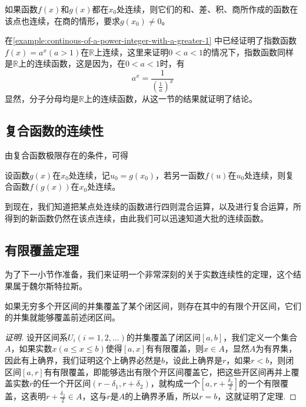 \begin{theorem}
  如果函数$f(x)$和$g(x)$都在$x_0$处连续，则它们的和、差、积、商所作成的函数在该点也连续，在商的情形，要求$g(x_0) \neq 0$。
\end{theorem}

\begin{example}
  \label{example:continous-of-power-function}
  在\autoref{example:continous-of-a-power-integer-with-a-greater-1} 中已经证明了指数函数$f(x)=a^x(a>1)$在$\mathbb{R}$上连续，这里来证明$0<a<1$的情况下，指数函数同样是$\mathbb{R}$上的连续函数，这是因为，在$0<a<1$时，有
  \[ a^x = \frac{1}{\left( \frac{1}{a} \right)^x} \]
  显然，分子分母均是$\mathbb{R}$上的连续函数，从这一节的结果就证明了结论。
\end{example}

\subsection{复合函数的连续性}
\label{sec:continuousness-of-composite-function}

由复合函数极限存在的条件，可得
\begin{theorem}[复合函数的连续性]
  \label{theorem:the-continuity-of-combine-function}
  设函数$g(x)$在$x_0$处连续，记$u_0=g(x_0)$，若另一函数$f(u)$在$u_0$处连续，则复合函数$f(g(x))$在$x_0$处连续。
\end{theorem}

到现在，我们知道把某点处连续的函数进行四则混合运算，以及进行复合运算，所得到的新函数仍然在该点连续，由此我们可以迅速知道大批的连续函数。

\subsection{有限覆盖定理}
\label{sec:finite-covering-theorem}

为了下一小节作准备，我们来证明一个非常深刻的关于实数连续性的定理，这个结果属于魏尔斯特拉斯。

\begin{theorem}[魏尔斯特拉斯有限覆盖定理]
  如果无穷多个开区间的并集覆盖了某个闭区间，则存在其中的有限个开区间，它们的并集就能够覆盖前述闭区间。
\end{theorem}

\begin{proof}[证明]
  设开区间系$U_i(i=1,2,\ldots)$的并集覆盖了闭区间$[a,b]$，我们定义一个集合$A$，如果实数$x(a \leqslant x \leqslant b)$使得$[a,x]$有有限覆盖，则$x \in A$，显然$A$为有界集，因此有上确界，我们证明这个上确界必然是$b$，设此上确界是$r$，如果$r<b$，则闭区间$[a,r]$有有限覆盖，即能够选出有限个开区间覆盖它，把这些开区间再并上覆盖实数$r$的任一个开区间$(r-\delta_1,r+\delta_2)$，就构成一个$[a,r+\frac{\delta_2}{2}]$的一个有限覆盖，这表明$r+\frac{\delta_2}{2}\in A$，这与$r$是$A$的上确界矛盾，所以$r=b$，这就证明了定理.
\end{proof}

